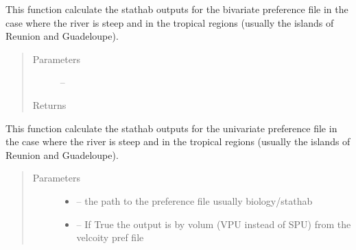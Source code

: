 \documentclass[letterpaper,10pt,english]{sphinxmanual}
\begin{document}
\begin{fulllineitems}
\begin{fulllineitems}
\begin{quote}
\begin{description}
\end{description}\end{quote}

\end{fulllineitems}


\begin{fulllineitems}
\label{\detokenize{index:src.stathab_c.Stathab.stathab_trop_biv}}
This function calculate the stathab outputs  for the bivariate preference file in the case where the river is
steep and in the tropical regions (usually the islands of Reunion and Guadeloupe).
\begin{quote}\begin{description}
\item[{Parameters}] \leavevmode
{} -- 

\item[{Returns}] \leavevmode


\end{description}\end{quote}

\end{fulllineitems}


\begin{fulllineitems}
\label{\detokenize{index:src.stathab_c.Stathab.stathab_trop_univ}}
This function calculate the stathab outputs  for the univariate preference file in the case where the river is
steep and in the tropical regions (usually the islands of Reunion and Guadeloupe).
\begin{quote}\begin{description}
\item[{Parameters}] \leavevmode\begin{itemize}
\item {} 
 -- the path to the preference file usually biology/stathab

\item {} 
 -- If True the output is by volum (VPU instead of SPU) from the velcoity pref file

\end{itemize}


\end{description}
\end{quote}
\end{fulllineitems}
\end{fulllineitems}
\end{document}
